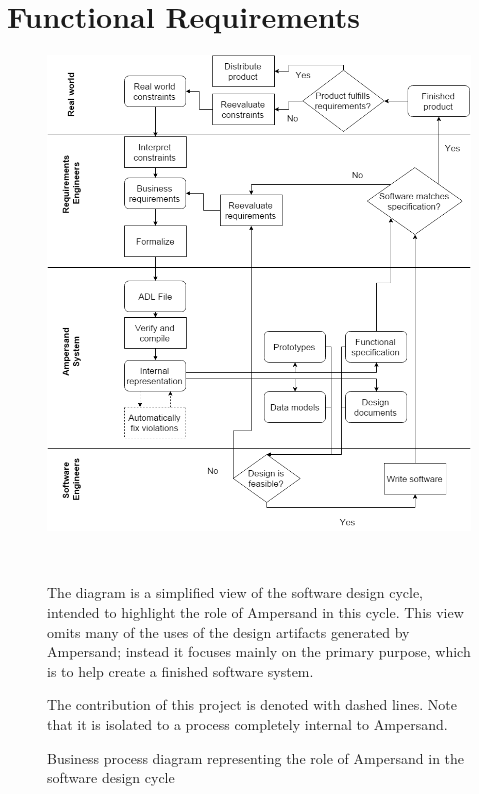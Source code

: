 \documentclass[12pt]{report}
\begin{document}
{\chapter{Functional Requirements}\label{ch:Functional}
\begin{figure}[!htb]
    \begin{center}
        \includegraphics[width=\textwidth]{../figures/business_process}
        \caption{Business process diagram representing the role of Ampersand in 
        the software design cycle}~\label{fig:BusinessProcess} \end{center}
The diagram is a simplified view of the software design cycle, intended to 
highlight 
the role of Ampersand in this cycle. This view omits many of the uses of the 
design artifacts generated by Ampersand; instead it focuses mainly on the 
primary purpose, which is to help create a finished software system. 

The contribution of this project is denoted with dashed lines. Note that it is
isolated to a process completely internal to Ampersand.    
\end{figure}


}
\end{document}
